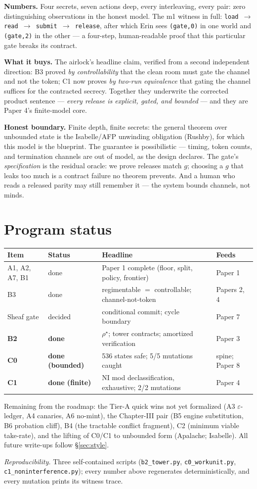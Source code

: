 \documentclass[11pt,a4paper]{article}
\begin{document}
\textbf{Numbers.} Four secrets, seven actions deep, every interleaving, every pair: zero distinguishing observations in the honest model. The m1 witness in full: \texttt{load $\to$ read $\to$ submit $\to$ release}, after which Erin sees \texttt{(gate,0)} in one world and \texttt{(gate,2)} in the other --- a four-step, human-readable proof that this particular gate breaks its contract.

\textbf{What it buys.} The airlock's headline claim, verified from a second independent direction: B3 proved \emph{by controllability} that the clean room must gate the channel and not the token; C1 now proves \emph{by two-run equivalence} that gating the channel suffices for the contracted secrecy. Together they underwrite the corrected product sentence --- \emph{every release is explicit, gated, and bounded} --- and they are Paper 4's finite-model core.

\begin{boundary}
\textbf{Honest boundary.} Finite depth, finite secrets: the general theorem over unbounded state is the Isabelle/AFP unwinding obligation (Rushby), for which this model is the blueprint. The guarantee is possibilistic --- timing, token counts, and termination channels are out of model, as the design declares. The gate's \emph{specification} is the residual oracle: we prove releases match $g$; choosing a $g$ that leaks too much is a contract failure no theorem prevents. And a human who reads a released parity may still remember it --- the system bounds channels, not minds.
\end{boundary}

\section{Program status}
\begin{center}
\begin{tabular}{@{}llll@{}}
\toprule
Item & Status & Headline & Feeds \\
\midrule
A1, A2, A7, B1 & done & Paper 1 complete (floor, split, policy, frontier) & Paper 1 \\
B3 & done & regimentable $=$ controllable; channel-not-token & Papers 2, 4 \\
Sheaf gate & decided & conditional commit; cycle boundary & Paper 7 \\
\textbf{B2} & \textbf{done} & $\rho^\star$; tower contracts; amortized verification & Paper 3 \\
\textbf{C0} & \textbf{done (bounded)} & 536 states safe; 5/5 mutations caught & spine; Paper 8 \\
\textbf{C1} & \textbf{done (finite)} & NI mod declassification, exhaustive; 2/2 mutations & Paper 4 \\
\bottomrule
\end{tabular}
\end{center}
Remaining from the roadmap: the Tier-A quick wins not yet formalized (A3 $\varepsilon$-ledger, A4 canaries, A6 no-mint), the Chapter-III pair (B5 engine substitution, B6 probation cliff), B4 (the tractable conflict fragment), C2 (minimum viable take-rate), and the lifting of C0/C1 to unbounded form (Apalache; Isabelle). All future write-ups follow \S\ref{sec:style}.

\vspace{0.4em}
\noindent\emph{Reproducibility.} Three self-contained scripts (\texttt{b2\_tower.py}, \texttt{c0\_workunit.py}, \texttt{c1\_noninterference.py}); every number above regenerates deterministically, and every mutation prints its witness trace.
\end{document}
